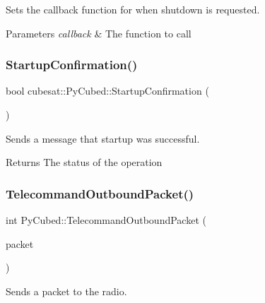 Sets the callback function for when shutdown is requested. 


\begin{DoxyParams}{Parameters}
{\em callback} & The function to call \\
\hline
\end{DoxyParams}
\mbox{\label{classcubesat_1_1PyCubed_afa1170644bf62745e36fcf6a479bbbee}} 
\subsubsection{\texorpdfstring{Startup\+Confirmation()}{StartupConfirmation()}}
{\footnotesize\ttfamily bool cubesat\+::\+Py\+Cubed\+::\+Startup\+Confirmation (\begin{DoxyParamCaption}{ }\end{DoxyParamCaption})\hspace{0.3cm}{\ttfamily [inline]}}



Sends a message that startup was successful. 

\begin{DoxyReturn}{Returns}
The status of the operation 
\end{DoxyReturn}
\mbox{\label{classcubesat_1_1PyCubed_ab662a7193869909f84e7f61abff835d4}} 
\subsubsection{\texorpdfstring{Telecommand\+Outbound\+Packet()}{TelecommandOutboundPacket()}}
{\footnotesize\ttfamily int Py\+Cubed\+::\+Telecommand\+Outbound\+Packet (\begin{DoxyParamCaption}\item[{\hyperlink{structcubesat_1_1PyCubedDataPacket}{Py\+Cubed\+Data\+Packet}}]{packet }\end{DoxyParamCaption})}



Sends a packet to the radio. 


